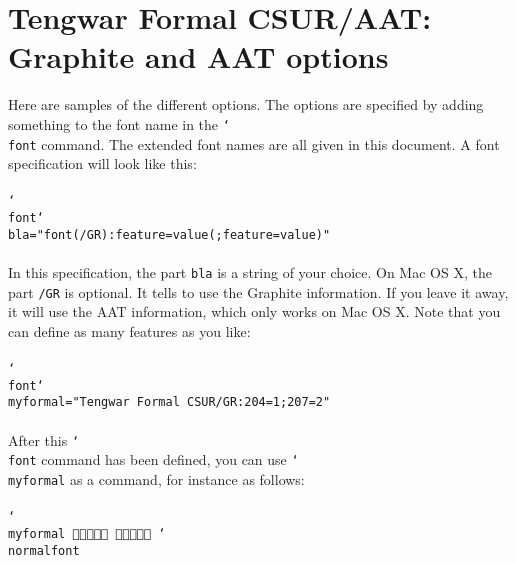 \documentclass[11pt,a4paper]{article}
\begin{document}
\tableofcontents

\section{Tengwar Formal CSUR/AAT: Graphite and AAT options}



Here are samples of the different options. The options are specified by adding something to the font name in the \texttt{\char`\\font} command. The extended font names are all given in this document. A font specification will look like this:

\paragraph{} \texttt{\char`\\font\char`\\bla="font(/GR):feature=value(;feature=value)"}

\paragraph{} In this specification, the part \texttt{bla} is a string of your choice. On Mac OS X, the part \texttt{/GR} is optional. It tells \XeTeX{} to use the Graphite information. If you leave it away, it will use the AAT information, which only works on Mac OS X. Note that you can define as many features as you like:

\paragraph{} \texttt{\char`\\font\char`\\myformal="Tengwar Formal CSUR/GR:204=1;207=2"}

\paragraph{} After this \texttt{\char`\\font} command has been defined, you can use \texttt{\char`\\myformal} as a command, for instance as follows:

\paragraph{} \texttt{\char`\\myformal   \char`\\normalfont}
\end{document}
